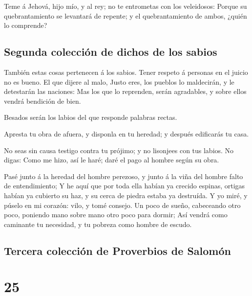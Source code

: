  Teme á Jehová, hijo mío, y al rey; no te entrometas con
los veleidosos:  Porque su quebrantamiento se levantará
de repente; y el quebrantamiento de ambos, ¿quién lo comprende?

\hypertarget{segunda-colecciuxf3n-de-dichos-de-los-sabios}{%
\subsection{Segunda colección de dichos de los
sabios}\label{segunda-colecciuxf3n-de-dichos-de-los-sabios}}

 También estas cosas pertenecen á los sabios. Tener
respeto á personas en el juicio no es bueno.  El que
dijere al malo, Justo eres, los pueblos lo maldecirán, y le detestarán
las naciones:  Mas los que lo reprenden, serán
agradables, y sobre ellos vendrá bendición de bien.

 Besados serán los labios del que responde palabras
rectas.

 Apresta tu obra de afuera, y disponla en tu heredad; y
después edificarás tu casa.

 No seas sin causa testigo contra tu prójimo; y no
lisonjees con tus labios.  No digas: Como me hizo, así le
haré; daré el pago al hombre según su obra.

 Pasé junto á la heredad del hombre perezoso, y junto á
la viña del hombre falto de entendimiento;  Y he aquí que
por toda ella habían ya crecido espinas, ortigas habían ya cubierto su
haz, y su cerca de piedra estaba ya destruída.  Y yo
miré, y púselo en mi corazón: vilo, y tomé consejo.  Un
poco de sueño, cabeceando otro poco, poniendo mano sobre mano otro poco
para dormir;  Así vendrá como caminante tu necesidad, y
tu pobreza como hombre de escudo.

\hypertarget{tercera-colecciuxf3n-de-proverbios-de-salomuxf3n}{%
\subsection{Tercera colección de Proverbios de
Salomón}\label{tercera-colecciuxf3n-de-proverbios-de-salomuxf3n}}

\hypertarget{section-20-25}{%
\section{25}\label{section-20-25}}

